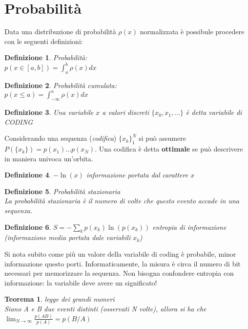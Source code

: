 \documentclass[12pt, a4paper]{book}
\theoremstyle{theorem}
\newtheorem{definition}{Definizione}[section]
\newtheorem{theorem}{Teorema}[section]
\begin{document}
		\section{Probabilità}
			Data una distribuzione di probabilità $\rho(x)$ normalizzata è possibule procedere con le seguenti definizioni:
			\begin{definition} Probabilità:\\
				$p(x\in[a,b])=\int_{a}^{b}\rho(x)dx$
			\end{definition}
			\begin{definition} Probabilità cumulata:\\
				$p(x\leq a)=\int_{-\infty}^{a}\rho(x)dx$
			\end{definition}
			\begin{definition}
				Una variabile $x$ a valori discreti $\{x_0,x_1,...\}$ è detta variabile di CODING
			\end{definition}
			Considerando una sequenza (\textit{codifica}) $\{x_k\}_1^N$ si può assumere $P(\{x_k\})=p(x_1)...p(x_N)$.
			Una codifica è detta \textbf{ottimale} se può descrivere in maniera univoca un'orbita.
			\begin{definition}
				$-\ln(x)$ informazione portata dal carattere $x$
			\end{definition}
			\begin{definition}
				Probabilità stazionaria\\
				La probabilità stazionaria è il numero di volte che questo evento accade in una sequenza.
			\end{definition}
			\begin{definition}
				$S=-\sum_kp(x_k)\ln(p(x_k))$ entropia di informazione (informazione media portata dale variabili $x_k$)
			\end{definition}
			Si nota subito come più un valore della variabile di coding è probabile, minor informazione questo porti.
			Informaticamente, la misura è circa il numero di bit necessari per memorizzare la sequenza.
			Non bisogna confondere entropia con informazione: la variabile deve avere un significato!
			\begin{theorem}
				legge dei grandi numeri\\
				Siano A e B due eventi distinti (osservati N volte), allora si ha che\\
				$\lim_{N\to\infty}\frac{p(AB)}{p(A)}=p(B/A)$
			\end{theorem}
\end{document}
